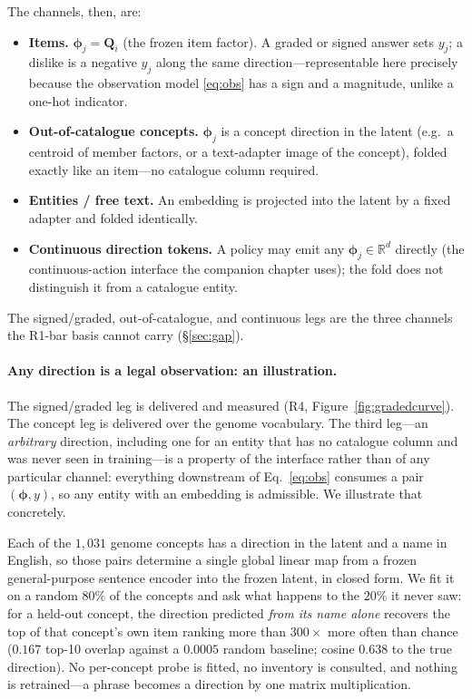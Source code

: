 \documentclass[11pt]{article}
\newcommand{\R}{\mathbb{R}}
\newcommand{\Q}{\mathbf{Q}}
\newcommand{\bphi}{\boldsymbol{\phi}}
\begin{document}
The channels, then, are:
\begin{itemize}[leftmargin=1.4em,itemsep=1.5pt]
  \item \textbf{Items.} $\bphi_j=\Q_i$ (the frozen item factor). A graded or signed answer sets $y_j$; a dislike is a
        negative $y_j$ along the same direction---representable here precisely because the observation model
        \eqref{eq:obs} has a sign and a magnitude, unlike a one-hot indicator.
  \item \textbf{Out-of-catalogue concepts.} $\bphi_j$ is a concept direction in the latent (e.g.\ a centroid of member
        factors, or a text-adapter image of the concept), folded exactly like an item---no catalogue column required.
  \item \textbf{Entities / free text.} An embedding is projected into the latent by a fixed adapter and folded
        identically.
  \item \textbf{Continuous direction tokens.} A policy may emit any $\bphi_j\in\R^{d}$ directly (the continuous-action
        interface the companion chapter uses); the fold does not distinguish it from a catalogue entity.
\end{itemize}
The signed/graded, out-of-catalogue, and continuous legs are the three channels the R1-bar basis cannot carry
(\S\ref{sec:gap}).

\paragraph{Any direction is a legal observation: an illustration.} The signed/graded leg is delivered and
measured (R4, Figure~\ref{fig:gradedcurve}). The concept leg is delivered over the genome vocabulary.
The third leg---an \emph{arbitrary} direction, including one for an entity that has no catalogue column and
was never seen in training---is a property of the interface rather than of any particular channel:
everything downstream of Eq.~\eqref{eq:obs} consumes a pair $(\bphi,y)$, so any entity with an
embedding is admissible. We illustrate that concretely.

Each of the $1{,}031$ genome concepts has a direction in the latent and a name in English, so those pairs
determine a single global linear map from a frozen general-purpose sentence encoder into the frozen latent,
in closed form. We fit it on a random $80\%$ of the concepts and ask what happens to the $20\%$ it never
saw: for a held-out concept, the direction predicted \emph{from its name alone} recovers the top of that
concept's own item ranking more than $300\times$ more often than chance ($0.167$ top-10 overlap against a
$0.0005$ random baseline; cosine $0.638$ to the true direction). No per-concept probe is fitted, no inventory is
consulted, and nothing is retrained---a phrase becomes a direction by one matrix multiplication.
\end{document}
